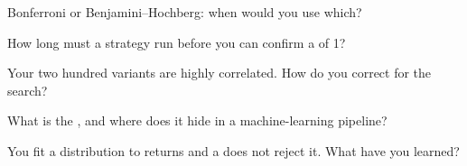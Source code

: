 \begin{interviewq}\label{iq:qm:testing-and-multiple-testing:3}
Bonferroni or Benjamini--Hochberg: when would you use which?
\end{interviewq}

\begin{interviewq}\label{iq:qm:testing-and-multiple-testing:4}
How long must a strategy run before you can confirm a  of 1?
\end{interviewq}

\begin{interviewq}\label{iq:qm:testing-and-multiple-testing:5}
Your two hundred variants are highly correlated. How do you correct for the search?
\end{interviewq}

\begin{interviewq}\label{iq:qm:testing-and-multiple-testing:6}
What is the , and where does it hide in a machine-learning pipeline?
\end{interviewq}

\begin{interviewq}\label{iq:qm:testing-and-multiple-testing:7}
You fit a distribution to returns and a  does not reject it. What have you learned?
\end{interviewq}
